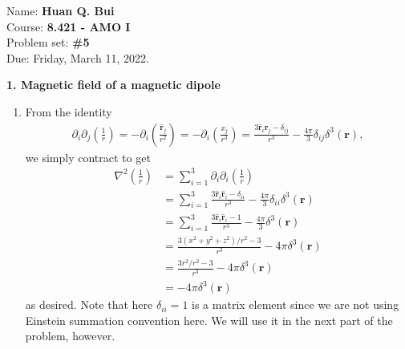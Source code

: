 \documentclass{article}
\theoremstyle{definition}
\newcommand{\p}{\partial}
\newcommand{\f}[2]{\frac{#1}{#2}}
\newcommand{\lp}{\left(}
\newcommand{\rp}{\right)}
\begin{document}
\begin{framed}
\noindent Name: \textbf{Huan Q. Bui}\\
Course: \textbf{8.421 - AMO I}\\
Problem set: \textbf{\#5}\\
Due: Friday, March 11, 2022.
\end{framed}



\noindent \textbf{1. Magnetic field of a magnetic dipole}


\begin{enumerate}[label=(\alph*)]
	\item From the identity
	\begin{align*}
	\p_i \p_j \lp \f{1}{r} \rp = -\p_i \lp \f{\hat{\bm{r}}_j}{r^2} \rp = -\p_i \lp \f{x_j}{r^3} \rp = \f{3 \hat{\bm{r}}_i \hat{\bm{r}}_j - \delta_{ij}}{r^3} - \f{4\pi}{3} \delta_{ij} \delta^3(\bm{r}),
	\end{align*}
	we simply contract to get
	\begin{align*}
	\nabla^2 \lp \f{1}{r} \rp 
	&= \sum_{i=1}^3 \p_i \p_i \lp \f{1}{r} \rp \\
	&=  \sum_{i=1}^3 \f{3 \hat{\bm{r}}_i \hat{\bm{r}}_i - \delta_{ii}}{r^3} - \f{4\pi}{3} \delta_{ii} \delta^3(\bm{r}) \\
	&= \sum_{i=1}^3 \f{3 \hat{\bm{r}}_i \hat{\bm{r}}_i - 1}{r^3} - \f{4\pi}{3} \delta^3(\bm{r}) \\
	&= \f{3(x^2+y^2+z^2)/r^2-3}{r^3} - 4\pi \delta^3(\bm{r})\\
	&= \f{3r^2/r^2-3}{r^3} - 4\pi \delta^3(\bm{r})\\
	&= -4\pi \delta^3(\bm{r})
	\end{align*}
	as desired. Note that here $\delta_{ii}=1$ is a matrix element since we are not using Einstein summation convention here. We will use it in the next part of the problem, however.  
	

\end{enumerate}
\end{document}
